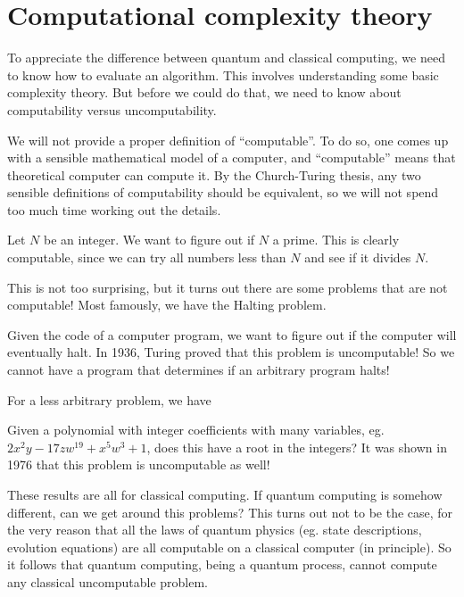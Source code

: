 \documentclass[a4paper]{article}
\begin{document}
\section{Computational complexity theory}
To appreciate the difference between quantum and classical computing, we need to know how to evaluate an algorithm. This involves understanding some basic complexity theory. But before we could do that, we need to know about computability versus uncomputability.

We will not provide a proper definition of ``computable''. To do so, one comes up with a sensible mathematical model of a computer, and ``computable'' means that theoretical computer can compute it. By the Church-Turing thesis, any two sensible definitions of computability should be equivalent, so we will not spend too much time working out the details.

\begin{eg}
  Let $N$ be an integer. We want to figure out if $N$ a prime. This is clearly computable, since we can try all numbers less than $N$ and see if it divides $N$.
\end{eg}

This is not too surprising, but it turns out there are some problems that are not computable! Most famously, we have the Halting problem.
\begin{eg}
  Given the code of a computer program, we want to figure out if the computer will eventually halt. In 1936, Turing proved that this problem is uncomputable! So we cannot have a program that determines if an arbitrary program halts!
\end{eg}

For a less arbitrary problem, we have
\begin{eg}
  Given a polynomial with integer coefficients with many variables, eg. $2x^2 y - 17 zw^{19} + x^5 w^3 + 1$, does this have a root in the integers? It was shown in 1976 that this problem is uncomputable as well!
\end{eg}

These results are all for classical computing. If quantum computing is somehow different, can we get around this problems? This turns out not to be the case, for the very reason that all the laws of quantum physics (eg. state descriptions, evolution equations) are all computable on a classical computer (in principle). So it follows that quantum computing, being a quantum process, cannot compute any classical uncomputable problem.
\end{document}
